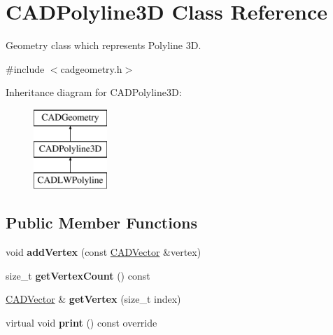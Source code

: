 \hypertarget{class_c_a_d_polyline3_d}{}\section{C\+A\+D\+Polyline3D Class Reference}
\label{class_c_a_d_polyline3_d}


Geometry class which represents Polyline 3D.  




{\ttfamily \#include $<$cadgeometry.\+h$>$}

Inheritance diagram for C\+A\+D\+Polyline3D\+:\begin{figure}[H]
\begin{center}
\leavevmode
\includegraphics[height=3.000000cm]{class_c_a_d_polyline3_d}
\end{center}
\end{figure}
\subsection*{Public Member Functions}
\begin{DoxyCompactItemize}
\item 
void {\bfseries add\+Vertex} (const \hyperlink{class_c_a_d_vector}{C\+A\+D\+Vector} \&vertex)\hypertarget{class_c_a_d_polyline3_d_a0b9a95bbd8d2827620c73f8de71fe371}{}\label{class_c_a_d_polyline3_d_a0b9a95bbd8d2827620c73f8de71fe371}

\item 
size\+\_\+t {\bfseries get\+Vertex\+Count} () const \hypertarget{class_c_a_d_polyline3_d_a95fa0ffcd115e7a0f45e0cd971f3d33f}{}\label{class_c_a_d_polyline3_d_a95fa0ffcd115e7a0f45e0cd971f3d33f}

\item 
\hyperlink{class_c_a_d_vector}{C\+A\+D\+Vector} \& {\bfseries get\+Vertex} (size\+\_\+t index)\hypertarget{class_c_a_d_polyline3_d_ae712c16461fae14a39c874beec0d0cdf}{}\label{class_c_a_d_polyline3_d_ae712c16461fae14a39c874beec0d0cdf}

\item 
virtual void {\bfseries print} () const  override\hypertarget{class_c_a_d_polyline3_d_a76faf32680a6486e2115970143df2900}{}\label{class_c_a_d_polyline3_d_a76faf32680a6486e2115970143df2900}

\end{DoxyCompactItemize}
